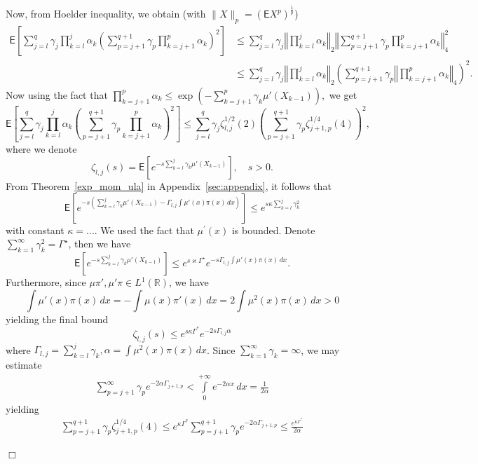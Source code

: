 \documentclass[bj]{imsart}
\newcommand{\proofendsign}{$\Box$}
\newenvironment{proof}{{\noindent \bf Proof }}
 {{\hspace*{\fill}\proofendsign\par\bigskip}}
\begin{document}
\begin{proof}
Now, from Hoelder inequality, we obtain (with $\|X\|_p = (\mathsf{E}X^p)^{\frac{1}{p}}$)
\begin{align*}
\mathsf{E}\left[\sum_{j=l}^{q}\gamma_{j}\prod_{k=l}^{j}\alpha_{k}\left(\sum_{p=j+1}^{q+1}\gamma_{p}\prod_{k=j+1}^{p}\alpha_{k}\right)^{2}\right] & \leq\sum_{j=l}^{q}\gamma_{j}\left\Vert \prod_{k=l}^{j}\alpha_{k}\right\Vert _{2}\left\Vert \sum_{p=j+1}^{q+1}\gamma_{p}\prod_{k=j+1}^{p}\alpha_{k}\right\Vert _{4}^{2}\\
 & \leq\sum_{j=l}^{q}\gamma_{j}\left\Vert \prod_{k=l}^{j}\alpha_{k}\right\Vert _{2}\left(\sum_{p=j+1}^{q+1}\gamma_{p}\left\Vert \prod_{k=j+1}^{p}\alpha_{k}\right\Vert _{4}\right)^{2}.
\end{align*}
Now using the fact that $\prod\limits_{k=j+1}^{p}\alpha_{k} \leq \exp\left(-\sum\limits_{k=j+1}^{p}\gamma_{k}\mu'(X_{k-1})\right),$
we get 
\[
\mathsf{E}\left[\sum_{j=l}^{q}\gamma_{j}\prod_{k=l}^{j}\alpha_{k}\left(\sum_{p=j+1}^{q+1}\gamma_{p}\prod_{k=j+1}^{p}\alpha_{k}\right)^{2}\right]\leq\sum_{j=l}^{q}\gamma_{j} \zeta^{1/2}_{l,j}(2) \left(\sum_{p=j+1}^{q+1}\gamma_{p} \zeta^{1/4}_{j+1,p}(4)\right)^{2},
\]
where we denote
\[
\zeta_{l,j}(s)=\mathsf{E}\left[e^{-s\sum_{k=l}^{j}\gamma_{k}\mu'(X_{k-1})}\right],\quad s>0.
\]
From Theorem~\ref{exp_mom_ula} in Appendix~\ref{sec:appendix}, it follows that
\[
\mathsf{E}\left[e^{-s\left(\sum_{k=l}^{j}\gamma_{k}\mu'(X_{k-1})-\Gamma_{l,j}\int\mu'(x)\pi(x)\,dx\right)}\right]\leq e^{s\kappa\sum_{k=l}^{j}\gamma_{k}^{2}}
\]
with constant $\kappa = ...$. We used the fact that $\mu^{\prime}(x)$ is bounded. Denote $\sum_{k=1}^{\infty}\gamma_{k}^{2} = \Gamma^{\star}$, then we have 
\[
\mathsf{E}\left[e^{-s\sum_{k=l}^{j}\gamma_{k}\mu'(X_{k-1})}\right]\leq e^{s\varkappa\Gamma^{\star}}e^{-s\Gamma_{l,j}\int\mu'(x)\pi(x)\,dx}.
\]
Furthermore, since $\mu\pi',\mu'\pi\in L^{1}(\mathbb{R})$, we have
\[
\int\mu'(x)\pi(x)\,dx=-\int\mu(x)\pi'(x)\,dx=2\int\mu^{2}(x)\pi(x)\,dx>0
\]
yielding the final bound
\[
\zeta_{l,j}(s) \leq e^{s\kappa \Gamma^*}e^{-2s\Gamma_{l,j}\alpha}
\]
where $\Gamma_{l,j} = \sum\limits_{k=l}^{j}\gamma_k, \alpha = \int \mu^2(x)\pi(x)\,dx$. Since $\sum\limits_{k=1}^{\infty}\gamma_k = \infty$, we may estimate
\begin{align*}
\sum\limits_{p=j+1}^{\infty} \gamma_p e^{-2\alpha \Gamma_{j+1,p}} < \int\limits_{0}^{+\infty}e^{-2\alpha x}\,dx = \frac{1}{2\alpha}
\end{align*}
yielding 
\begin{align*}
\sum_{p=j+1}^{q+1}\gamma_{p} \zeta^{1/4}_{j+1,p}(4) \leq e^{\kappa \Gamma^*}\sum_{p=j+1}^{q+1}\gamma_{p}e^{-2\alpha \Gamma_{j+1,p}} \leq \frac{e^{\kappa \Gamma^*}}{2\alpha} 

\end{align*}
\end{proof}
\end{document}
